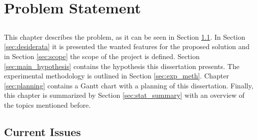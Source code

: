 \chapter{Problem Statement} \label{chap:problem_statement} \minitoc

\section*{}

This chapter describes the problem, as it can be seen in Section \ref{sec:current_issues}. In Section \ref{sec:desiderata} it is presented the wanted features for the proposed solution and in Section \ref{sec:scope} the scope of the project is defined. Section \ref{sec:main_hypothesis} contains the hypothesis this dissertation presents. The experimental methodology is outlined in Section \ref{sec:exp_meth}. Chapter \ref{sec:planning} contains a Gantt chart with a planning of this dissertation. Finally, this chapter is summarized by Section \ref{sec:stat_summary} with an overview of the topics mentioned before.

\section{Current Issues}\label{sec:current_issues}

